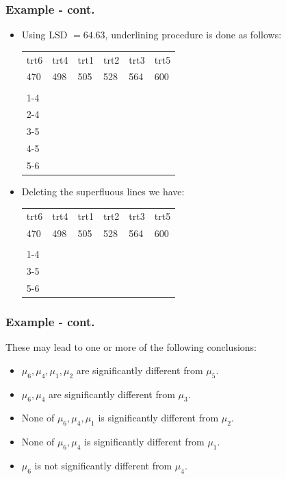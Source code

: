 \documentclass[xcolor=dvipsnames,12pt]{beamer}
\begin{document}
\begin{frame}
\frametitle{Example - cont.}
\begin{itemize}
\item Using LSD $ = 64.63$,
underlining procedure  is done as follows:
\hspace*{1in}\begin{tabular}{llllll}
       trt6 & trt4 & trt1 & trt2 & trt3 & trt5 \\[.1in]
  470 & 498 & 505 & 528 & 564 & 600 \\[-0.2in]
       \\ \cline{1-4}\\[.0001in]
        \cline{2-4}\\[.0002in]
        \cline{3-5}\\[.0003in]
        \cline{4-5}\\[.0004in]
        \cline{5-6}\\
       \end{tabular}
\item Deleting the superfluous lines we have:
\hspace*{1in}\begin{tabular}{llllll}
       trt6 & trt4 & trt1 & trt2 & trt3 & trt5 \\[.1in]
  470 & 498 & 505 & 528 & 564 & 600 \\[-0.2in]
       \\ \cline{1-4}\\[.0001in]
        \cline{3-5}\\[.0002in]
        \cline{5-6}\\[.0003in]
       \end{tabular}
\end{itemize}
\end{frame}


\begin{frame}
\frametitle{Example - cont.}
These may lead to one or more of the following conclusions:\\[.1in]
\begin{itemize}
\item $\mu_6, \mu_4, \mu_1, \mu_2$ are significantly different from
         $\mu_5$.
\item $\mu_6, \mu_4$ are significantly different from $\mu_3$.
\item  None of $\mu_6, \mu_4, \mu_1$ is significantly different from $\mu_2$.
\item None of $\mu_6, \mu_4$ is significantly different from
           $\mu_1$.
\item $\mu_6$ is not significantly different from $\mu_4$.
\end{itemize}
\end{frame}
\end{document}
